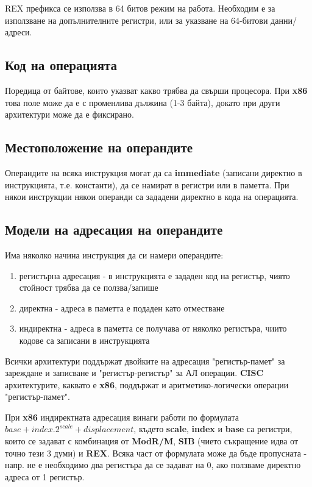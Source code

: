 \documentclass[fleqn,12pt]{article}
\begin{document}
REX префикса се използва в 64 битов режим на работа. Необходим е за използване на допълнителните регистри, или за указване на 64-битови данни/адреси.

\subsection{Код на операцията}
Поредица от байтове, които указват какво трябва да свърши процесора. При \textbf{x86} това поле може да е с променлива дължина (1-3 байта), докато 
при други архитектури може да е фиксирано.

\subsection{Местоположение на операндите}
Операндите на всяка инструкция могат да са \textbf{immediate} (записани директно в инструкцията, т.е. константи), да се намират в регистри 
или в паметта. При някои инструкции някои операнди са зададени директно в кода на операцията.

\subsection{Модели на адресация на операндите}
Има няколко начина инструкция да си намери операндите:
\begin{enumerate}
    \item регистърна адресация - в инструкцията е зададен код на регистър, чиято стойност трябва да се ползва/запише
    \item директна - адреса в паметта е подаден като отместване
    \item индиректна - адреса в паметта се получава от няколко регистъра, чиито кодове са записани в инструкцията
\end{enumerate}

Всички архитектури поддържат двойките на адресация "регистър-памет" за зареждане и записване и "регистър-регистър" за АЛ операции. 
\textbf{CISC} архитектурите, каквато е \textbf{x86}, поддържат и аритметико-логически операции "регистър-памет".

При \textbf{x86} индиректната адресация винаги работи по формулата $ base + index . 2^{scale} + displacement $,
където \textbf{scale}, \textbf{index} и \textbf{base} са регистри, които се задават с комбинация от 
\textbf{ModR/M}, \textbf{SIB} (чието съкращение идва от точно тези 3 думи) и \textbf{REX}. Всяка част от формулата
може да бъде пропусната - напр. не е необходимо два регистъра да се задават на 0, ако ползваме директно адреса от 1 регистър.
\end{document}

